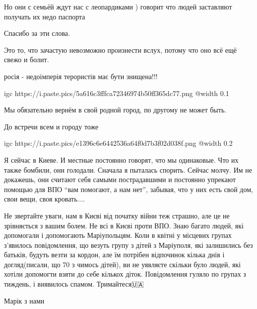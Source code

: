 
Но они с семьёй ждут нас с леопардиками ) говорит что людей заставляют получать
их недо паспорта 🤬


Спасибо за эти слова.

Это то, что зачастую невозможно произнести вслух, потому что оно всё ещё свежо
и болит.


росія - недоімперія терористів має бути знищена!!!


\ifcmt
  igc https://i.paste.pics/5a616c3fffca72346974b50ff365dc77.png
  @width 0.1
\fi


Мы обязательно вернём в свой родной город, по другому не может быть.

До встречи всем и городу тоже


\ifcmt
  igc https://i.paste.pics/e1396c6e6442536a64f0d7b3f02d038f.png
  @width 0.2
\fi


Я сейчас в Киеве. И местные постоянно говорят, что мы одинаковые. Что их также
бомбили, они голодали. Сначала я пыталась спорить. Сейчас молчу. Им не
докажешь, они считают себя самыми пострадавшими и постоянно упрекают помощью
для ВПО \enquote{вам помогают, а нам нет}, забывая, что у них есть свой дом, свои вещи,
своя кровать....

\begin{itemize} %

Не звертайте уваги, нам в Києві від початку війни теж страшно, але це не
зрівняється з вашим болем. Не всі в Києві проти ВПО. Знаю багато людей, які
допомогали і допомогають Маріупольцям. Коли в квітні у місцевих групах з'явилось
повідомлення, що везуть групу з дітей з Маріуполя, які залишились без
батьків, будуть везти за кордон, але їм потрібен відпочинок кілька днів і
догляд(писали, що 70 з чимось дітей), ви не уявляєте скільки було людей, які
хотіли допомогти взяти до себе кількох діток. Повідомлення гуляло по групах з
тиждень, і виявилось спамом. Тримайтеся🇺🇦

\end{itemize} %


Марік з нами

